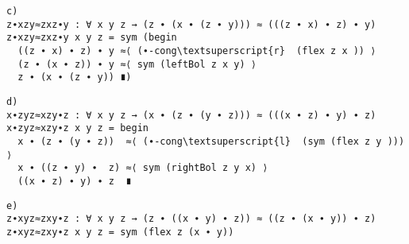 \begin{Verbatim}[commandchars=\\\{\},samepage=true]
c)
z∙xzy≈zxz∙y : ∀ x y z → (z ∙ (x ∙ (z ∙ y))) ≈ (((z ∙ x) ∙ z) ∙ y)
z∙xzy≈zxz∙y x y z = sym (begin
  ((z ∙ x) ∙ z) ∙ y ≈⟨ (∙-cong\textsuperscript{r}  (flex z x )) ⟩
  (z ∙ (x ∙ z)) ∙ y ≈⟨ sym (leftBol z x y) ⟩
  z ∙ (x ∙ (z ∙ y)) ∎)
\end{Verbatim}

\begin{Verbatim}[commandchars=\\\{\},samepage=true]
d)
x∙zyz≈xzy∙z : ∀ x y z → (x ∙ (z ∙ (y ∙ z))) ≈ (((x ∙ z) ∙ y) ∙ z)
x∙zyz≈xzy∙z x y z = begin
  x ∙ (z ∙ (y ∙ z))  ≈⟨ (∙-cong\textsuperscript{l}  (sym (flex z y ))) ⟩
  x ∙ ((z ∙ y) ∙  z) ≈⟨ sym (rightBol z y x) ⟩
  ((x ∙ z) ∙ y) ∙ z  ∎
\end{Verbatim}

\begin{Verbatim}[commandchars=\\\{\},samepage=true]
e)
z∙xyz≈zxy∙z : ∀ x y z → (z ∙ ((x ∙ y) ∙ z)) ≈ ((z ∙ (x ∙ y)) ∙ z)
z∙xyz≈zxy∙z x y z = sym (flex z (x ∙ y))
\end{Verbatim}
